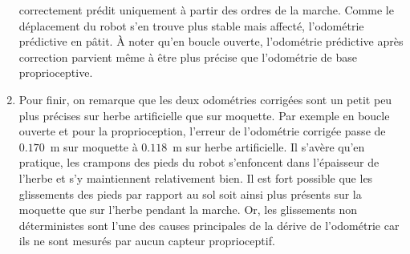 \begin{enumerate}
        correctement prédit uniquement à partir des ordres de la marche. 
        Comme le déplacement du robot s'en trouve plus stable mais affecté, 
        l'odométrie prédictive en pâtit.
        À noter qu'en boucle ouverte, l'odométrie prédictive après correction
        parvient même à être plus précise que l'odométrie de base proprioceptive.
    \item Pour finir, on remarque que les deux odométries corrigées 
        sont un petit peu plus précises sur herbe artificielle que sur moquette.
        Par exemple en boucle ouverte et pour la proprioception, l'erreur de
        l'odométrie corrigée passe de $0.170$~m sur moquette à $0.118$~m sur herbe artificielle.
        Il s'avère qu'en pratique, les crampons des pieds du robot s'enfoncent dans 
        l'épaisseur de l'herbe et s'y maintiennent relativement bien.
        Il est fort possible que les glissements des pieds par rapport au sol soit ainsi
        plus présents sur la moquette que sur l'herbe pendant la marche.
        Or, les glissements non déterministes sont l'une des causes principales de la dérive 
        de l'odométrie car ils ne sont mesurés par aucun capteur proprioceptif.
\end{enumerate}

